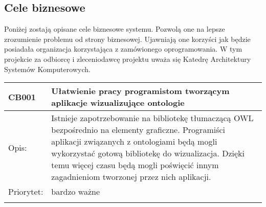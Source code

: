 \subsection{Cele biznesowe}
Poniżej zostają opisane cele biznesowe systemu. Pozwolą one na lepsze zrozumienie problemu od strony biznesowej. Ujawniają one korzyści jak będzie posiadała 
organizacja korzystająca z zamówionego oprogramowania. W tym projekcie za odbiorcę i zleceniodawcę projektu uważa się Katedrę Architektury Systemów Komputerowych.   
\begin{center}
\begin{tabular}{|m{3cm}|m{9cm}|} \hline

CB001 & Ułatwienie pracy programistom tworzącym aplikacje wizualizujące ontologie  \\ \hline
Opis: & Istnieje zapotrzebowanie na bibliotekę tłumaczącą OWL bezpośrednio na elementy graficzne. Programiści aplikacji związanych z ontologiami będą mogli 
wykorzystać gotową bibliotekę do wizualizacja. Dzięki temu więcej czasu będą mogli poświęcić innym zagadnieniom tworzonej przez nich aplikacji.   \\ \hline
Priorytet: & bardzo ważne \\ \hline
\multicolumn{2}{c}{} \\



\end{tabular}
\end{center}
